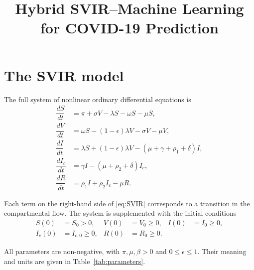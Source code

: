 \documentclass[11pt,a4paper]{article}
\title{Hybrid SVIR--Machine Learning for COVID-19 Prediction}
\author{}
\date{}
\begin{document}
\maketitle

\section{The SVIR model}

The full system of nonlinear ordinary differential equations is
\begin{subequations} \label{eq:SVIR}
\begin{align}
    \dfrac{dS}{dt} &= \pi + \sigma V - \lambda S - \omega S - \mu S, \label{eq:SVIR_S}\\
    \dfrac{dV}{dt} &= \omega S - (1 - \epsilon) \lambda V - \sigma V - \mu V, \label{eq:SVIR_V}\\
    \dfrac{dI}{dt} &= \lambda S + (1 - \epsilon) \lambda V - (\mu + \gamma + \rho_1 + \delta) I, \label{eq:SVIR_I}\\
    \dfrac{dI_c}{dt} &= \gamma I - (\mu + \rho_2 + \delta) I_c, \label{eq:SVIR_Ic}\\
    \dfrac{dR}{dt} &= \rho_1 I + \rho_2 I_c - \mu R. \label{eq:SVIR_R}
\end{align}
\end{subequations}

Each term on the right-hand side of \eqref{eq:SVIR} corresponds to a transition in the compartmental flow. The system is supplemented with the initial conditions
\begin{equation}
\begin{aligned}
    S(0)&=S_0>0, &
    V(0)&=V_0\geq 0, &
    I(0)&=I_0\geq 0, \\
    I_c(0)&=I_{c,0}\geq 0, &
    R(0)&=R_0\geq 0.
\end{aligned}
\label{eq:initial_conditions}
\end{equation}

All parameters are non-negative, with \(\pi,\mu,\beta>0\) and \(0\leq\epsilon\leq 1\). Their meaning and units are given in Table~\ref{tab:parameters}.
\end{document}
